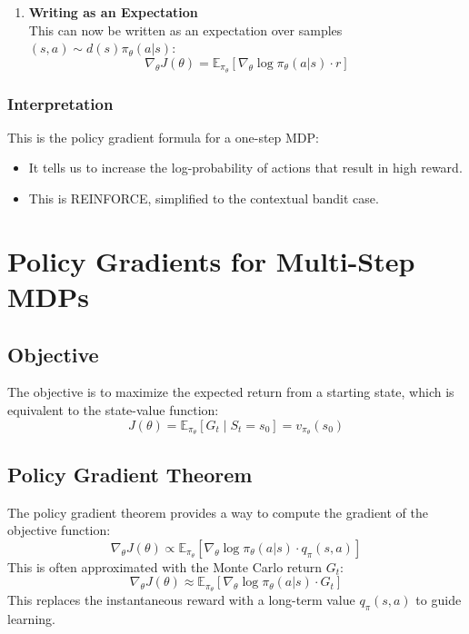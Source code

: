 \documentclass[12pt]{article}
\begin{document}
\begin{enumerate}
    \item \textbf{Writing as an Expectation} \\
    This can now be written as an expectation over samples $(s,a) \sim d(s)\pi_\theta(a|s)$:
    \begin{equation}
    \nabla_\theta J(\theta) = \mathbb{E}_{\pi_\theta}\left[ \nabla_\theta \log \pi_\theta(a|s) \cdot r \right]
    \end{equation}
\end{enumerate}

\subsubsection*{Interpretation}
This is the policy gradient formula for a one-step MDP:
\begin{itemize}
    \item It tells us to increase the log-probability of actions that result in high reward.
    \item This is REINFORCE, simplified to the contextual bandit case.
\end{itemize}


\section{Policy Gradients for Multi-Step MDPs }

\subsection{Objective}
The objective is to maximize the expected return from a starting state, which is equivalent to the state-value function:
$$ J(\theta) = \mathbb{E}_{\pi_\theta}[G_t \mid S_t = s_0] = v_{\pi_\theta}(s_0) $$

\subsection{Policy Gradient Theorem}
The policy gradient theorem provides a way to compute the gradient of the objective function:
$$ \nabla_\theta J(\theta) \propto \mathbb{E}_{\pi_\theta} \left[ \nabla_\theta \log \pi_\theta(a|s) \cdot q_\pi(s,a) \right] $$
This is often approximated with the Monte Carlo return $G_t$:
$$ \nabla_\theta J(\theta) \approx \mathbb{E}_{\pi_\theta} \left[ \nabla_\theta \log \pi_\theta(a|s) \cdot G_t \right] $$
This replaces the instantaneous reward with a long-term value $q_\pi(s,a)$ to guide learning.
\end{document}
